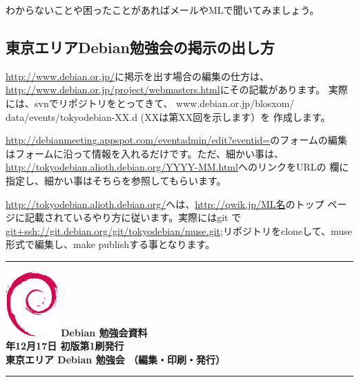 \documentclass[mingoth,a4paper]{jsarticle}
\newcommand{\debmtgyear}{2011}
\newcommand{\debmtgmonth}{12}
\newcommand{\debmtgdate}{17}
\begin{document}
わからないことや困ったことがあればメールやMLで聞いてみましょう。

\subsection{東京エリアDebian勉強会の掲示の出し方}

\url{http://www.debian.or.jp/}に掲示を出す場合の編集の仕方は、
\url{http://www.debian.or.jp/project/webmasters.html}にその記載があります。
実際には、svnでリポジトリをとってきて、
www.debian.or.jp/blosxom/ data/events/tokyodebian-XX.d (XXは第XX回を示します）を
作成します。

\url{http://debianmeeting.appspot.com/eventadmin/edit?eventid=}のフォームの編集
はフォームに沿って情報を入れるだけです。ただ、細かい事は、\url{http://tokyodebian.alioth.debian.org/YYYY-MM.html}へのリンクをURLの
欄に指定し、細かい事はそちらを参照してもらいます。

\url{http://tokyodebian.alioth.debian.org/}へは、\url{http://qwik.jp/ML名}のトップ
ページに記載されているやり方に従います。実際にはgit
で\url{git+ssh://git.debian.org/git/tokyodebian/muse.git};リポジトリをcloneして、muse形式で編集し、make publishする事となります。

\printindex

\cleartooddpage

\vspace*{15cm}
\hrule
\vspace{2mm}
\includegraphics[width=2cm]{image200502/openlogo-nd.eps}
\noindent \Large \bf Debian 勉強会資料\\
\noindent \normalfont \debmtgyear{}年\debmtgmonth{}月\debmtgdate{}日 \hspace{5mm}  初版第1刷発行\\
\noindent \normalfont 東京エリア Debian 勉強会 （編集・印刷・発行）\\
\hrule
\end{document}
